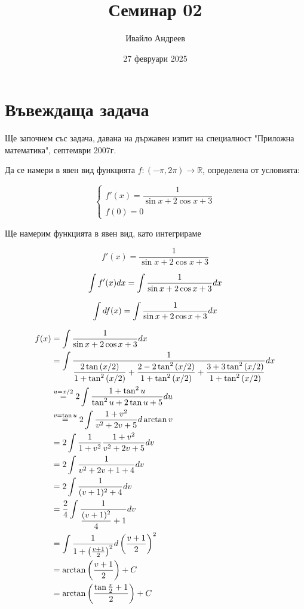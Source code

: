\documentclass{scrartcl}
\title{Семинар 02}
\author{Ивайло Андреев}
\date{27 февруари 2025}
\begin{document}
\maketitle  %

\section{Въвеждаща задача}

\begin{FlushLeft}
Ще започнем със задача, давана на държавен изпит на специалност "Приложна математика", септември 2007г.
\end{FlushLeft}

\begin{FlushLeft}
Да се намери в явен вид функцията $f:(-\pi, 2\pi)\rightarrow\mathbb{R}$, определена от условията:
\end{FlushLeft}

$$
\begin{cases}
f'(x) = \dfrac{1}{\sin{x}+2\cos{x}+3}
\\
f(0) = 0
\end{cases}
$$

\begin{FlushLeft}
Ще намерим функцията в явен вид, като интегрираме
\end{FlushLeft}

$$f'(x) = \dfrac{1}{\sin{x}+2\cos{x}+3}$$

$$\displaystyle \int f'(x)\space dx = \int \dfrac{1}{\sin{x}+2\cos{x}+3} \space dx$$

$$\displaystyle \int \space df(x) = \int \dfrac{1}{\sin{x}+2\cos{x}+3} \space dx$$

\begin{align*}
\displaystyle f(x)
&= \int \dfrac{1}{\sin{x}+2\cos{x}+3} \space dx\\
&= \int \dfrac{1}{\dfrac{2\tan{(x/2)}}{1+\tan^2{(x/2)}}+\dfrac{2-2\tan^2{(x/2)}}{1+\tan^2{(x/2)}}+\dfrac{3+3\tan^2{(x/2)}}{1+\tan^2{(x/2)}}} \space dx\\
&\overset{u = x/2}{=} 2\int \dfrac{1+\tan^2{u}}{\tan^2{u}+2\tan{u}+5} \space du\\
&\overset{v=\tan{u}}{=} 2\int \dfrac{1+v^2}{v^2+2v+5} \space d\arctan{v}\\
&= 2\int \dfrac{1}{1+v^2}\dfrac{1+v^2}{v^2+2v+5} \space dv\\
&= 2\int \dfrac{1}{v^2+2v+1+4} \space dv\\
&= 2\int \dfrac{1}{(v+1)^2+4} \space dv\\
&= \dfrac{2}{4}\int \dfrac{1}{\dfrac{(v+1)^2}{4}+1} \space dv\\
&= \int \dfrac{1}{1+\left(\frac{v+1}{2}\right)^2} \space d\left(\frac{v+1}{2}\right)^2\\
&= \arctan{\left(\dfrac{v+1}{2}\right)} + C\\
&= \arctan{\left(\dfrac{\tan{\frac{x}{2}}+1}{2}\right)} + C
\end{align*}
\end{document}
